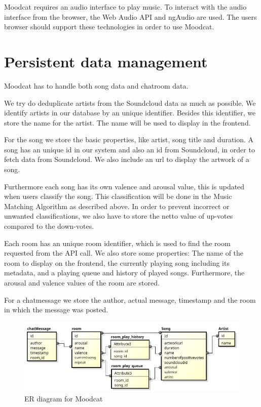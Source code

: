 \par
Moodcat requires an audio interface to play music.
To interact with the audio interface from the browser, the Web Audio API\cite{WebAudioAPI} and ngAudio\cite{ngAudio} are used.
The users browser should support these technologies in order to use Moodcat.

\section{Persistent data management}
Moodcat has to handle both song data and chatroom data.

\par
We try do deduplicate artists from the Soundcloud data as much as possible. We identify artists in our database by an unique identifier. Besides this identifier, we store the name for the artist. The name will be used to display in the frontend.

\par
For the song we store the basic properties, like artist, song title and duration.
A song has an unique id in our system and also an id from \gls{Soundcloud}, in order to fetch data from Soundcloud.
We also include an url to display the artwork of a song.

Furthermore each song has its own \gls{valence} and \gls{arousal} value, this is updated when users classify the song.
This classification will be done in the Music Matching Algorithm as described above. In order to prevent incorrect or unwanted classifications, we also have to store the netto value of up-votes compared to the down-votes.

\par 
Each room has an unique room identifier, which is used to find the room requested from the API call.
We also store some properties: The name of the room to display on the frontend, the currently playing song including its metadata, 
and a playing queue and history of played songs.
Furthermore, the arousal and valence values of the room are stored.

\par
For a chatmessage we store the author, actual message, timestamp and the room in which the message was posted.

\begin{figure}[H]
\includegraphics[scale=.6]{erDiagram.png}
\caption{ER diagram for Moodcat}
\label{fig:ER diagram of the described entities}
\end{figure}

